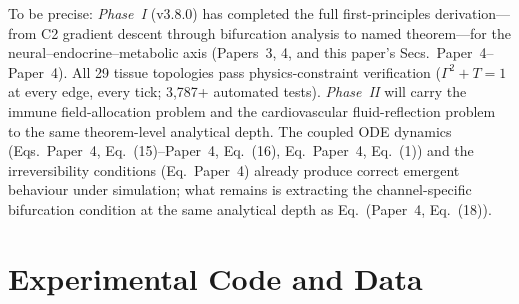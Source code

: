 \documentclass[aps,pre,twocolumn,superscriptaddress,floatfix]{revtex4-2}
\begin{document}
To be precise:
\emph{Phase~I} (v3.8.0) has completed
the full first-principles derivation---from
C2 gradient descent through bifurcation analysis
to named theorem---for the
neural--endocrine--metabolic axis
(Papers~3, 4, and this paper's
Secs.~Paper~4--Paper~4).
All 29 tissue topologies pass physics-constraint
verification ($\Gamma^2 + T = 1$ at every edge,
every tick; 3,787+ automated tests).
\emph{Phase~II} will carry the immune
field-allocation problem and the cardiovascular
fluid-reflection problem to the same
theorem-level analytical depth.
The coupled ODE dynamics
(Eqs.~Paper~4, Eq.~(15)--Paper~4, Eq.~(16),
Eq.~Paper~4, Eq.~(1)) and the
irreversibility conditions
(Eq.~Paper~4) already produce
correct emergent behaviour under simulation;
what remains is extracting the
channel-specific bifurcation condition at the
same analytical depth as
Eq.~(Paper~4, Eq.~(18)).






\appendix

\section{Experimental Code and Data}
\label{app:code}
\end{document}
